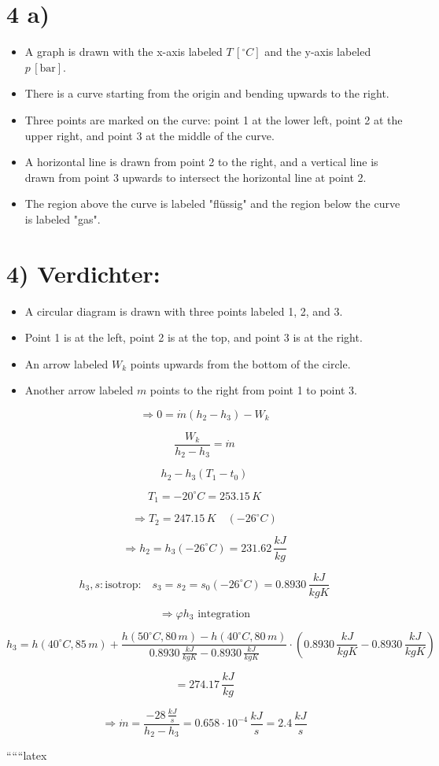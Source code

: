 \section*{4 a)}

\begin{itemize}
    \item A graph is drawn with the x-axis labeled $T \, [^\circ C]$ and the y-axis labeled $p \, [\text{bar}]$.
    \item There is a curve starting from the origin and bending upwards to the right.
    \item Three points are marked on the curve: point 1 at the lower left, point 2 at the upper right, and point 3 at the middle of the curve.
    \item A horizontal line is drawn from point 2 to the right, and a vertical line is drawn from point 3 upwards to intersect the horizontal line at point 2.
    \item The region above the curve is labeled "flüssig" and the region below the curve is labeled "gas".
\end{itemize}

\section*{4) Verdichter:}

\begin{itemize}
    \item A circular diagram is drawn with three points labeled 1, 2, and 3.
    \item Point 1 is at the left, point 2 is at the top, and point 3 is at the right.
    \item An arrow labeled $W_k$ points upwards from the bottom of the circle.
    \item Another arrow labeled $m$ points to the right from point 1 to point 3.
\end{itemize}

\[
\Rightarrow 0 = \dot{m} (h_2 - h_3) - W_k
\]

\[
\frac{W_k}{h_2 - h_3} = \dot{m}
\]

\[
h_2 - h_3 (T_1 - t_0)
\]

\[
T_1 = -20^\circ C = 253.15 \, K
\]

\[
\Rightarrow T_2 = 247.15 \, K \quad (-26^\circ C)
\]

\[
\Rightarrow h_2 = h_3 (-26^\circ C) = 231.62 \, \frac{kJ}{kg}
\]

\[
h_3, s: \text{isotrop:} \quad s_3 = s_2 = s_0 (-26^\circ C) = 0.8930 \, \frac{kJ}{kgK}
\]

\[
\Rightarrow \varphi h_3 \text{ integration}
\]

\[
h_3 = h(40^\circ C, 85 \, m) + \frac{h(50^\circ C, 80 \, m) - h(40^\circ C, 80 \, m)}{0.8930 \, \frac{kJ}{kgK} - 0.8930 \, \frac{kJ}{kgK}} \cdot (0.8930 \, \frac{kJ}{kgK} - 0.8930 \, \frac{kJ}{kgK})
\]

\[
= 274.17 \, \frac{kJ}{kg}
\]

\[
\Rightarrow \dot{m} = \frac{-28 \, \frac{kJ}{s}}{h_2 - h_3} = 0.658 \cdot 10^{-4} \, \frac{kJ}{s} = 2.4 \, \frac{kJ}{s}
\]

``````latex